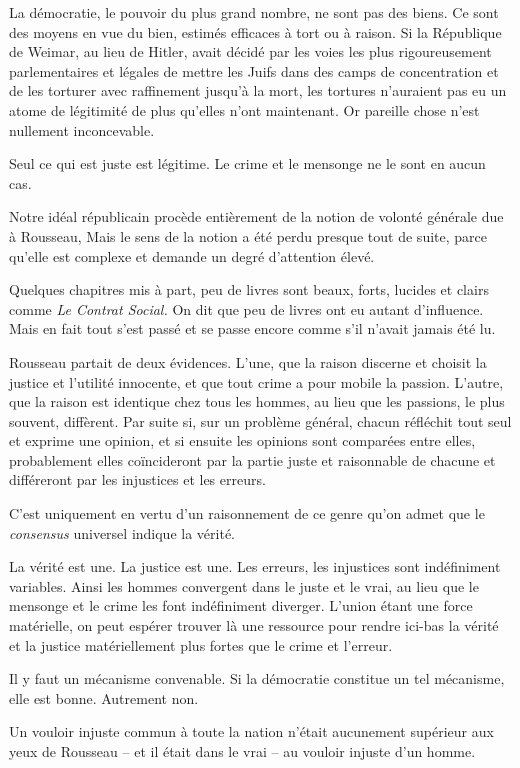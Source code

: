 \documentclass[french,twoside]{book} %
\begin{document}
La démocratie, le pouvoir du plus grand nombre, ne sont pas des biens. Ce sont des moyens en vue du bien, estimés efficaces à tort ou à raison. Si la République de Weimar, au lieu de Hitler, avait décidé par les voies les plus rigoureusement parlementaires et légales de mettre les Juifs dans des camps de concentration et de les torturer avec raffinement jusqu’à la mort, les tortures n’auraient pas eu un atome de légitimité de plus qu’elles n’ont maintenant. Or pareille chose n’est nullement inconcevable.\par
Seul ce qui est juste est légitime. Le crime et le mensonge ne le sont en aucun cas.\par
Notre idéal républicain procède entièrement de la notion de volonté générale due à Rousseau, Mais le sens de la notion a été perdu presque tout de suite, parce qu’elle est complexe et demande un degré d’attention élevé.\par
Quelques chapitres mis à part, peu de livres sont beaux, forts, lucides et clairs comme \emph{Le Contrat Social.} On dit que peu de livres ont eu autant d’influence. Mais en fait tout s’est passé et se passe encore comme s’il n’avait jamais été lu.\par
Rousseau partait de deux évidences. L’une, que la raison discerne et choisit la justice et l’utilité innocente, et que tout crime a pour mobile la passion. L’autre, que la raison est identique chez tous les hommes, au lieu que les passions, le plus souvent, diffèrent. Par suite si, sur un problème général, chacun réfléchit tout seul et exprime une opinion, et si ensuite les opinions sont comparées entre elles, probablement elles coïncideront par la partie juste et raisonnable de chacune et différeront par les injustices et les erreurs.\par
C’est uniquement en vertu d’un raisonnement de ce genre qu’on admet que le \emph{consensus} universel indique la vérité.\par
La vérité est une. La justice est une. Les erreurs, les injustices sont indéfiniment variables. Ainsi les hommes convergent dans le juste et le vrai, au lieu que le mensonge et le crime les font indéfiniment diverger. L’union étant une force matérielle, on peut espérer trouver là une ressource pour rendre ici-bas la vérité et la justice matériellement plus fortes que le crime et l’erreur.\par
Il y faut un mécanisme convenable. Si la démocratie constitue un tel mécanisme, elle est bonne. Autrement non.\par
Un vouloir injuste commun à toute la nation n’était aucunement supérieur aux yeux de Rousseau – et il était dans le vrai – au vouloir injuste d’un homme.\par
\end{document}
